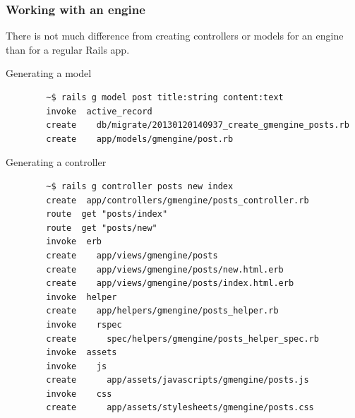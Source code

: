 \documentclass[compress]{beamer}
\begin{document}
\begin{frame}[fragile]
\frametitle{Working with an engine}

There is not much difference from creating controllers or models for an engine
than for a regular Rails app.
\begin{itemize}
    \begin{item}
      Generating a model
      \begin{verbatim}
        ~$ rails g model post title:string content:text
        invoke  active_record
        create    db/migrate/20130120140937_create_gmengine_posts.rb
        create    app/models/gmengine/post.rb
      \end{verbatim}
    \end{item}
    \begin{item}
      Generating a controller
      \begin{verbatim}
        ~$ rails g controller posts new index
        create  app/controllers/gmengine/posts_controller.rb
        route  get "posts/index"
        route  get "posts/new"
        invoke  erb
        create    app/views/gmengine/posts
        create    app/views/gmengine/posts/new.html.erb
        create    app/views/gmengine/posts/index.html.erb
        invoke  helper
        create    app/helpers/gmengine/posts_helper.rb
        invoke    rspec
        create      spec/helpers/gmengine/posts_helper_spec.rb
        invoke  assets
        invoke    js
        create      app/assets/javascripts/gmengine/posts.js
        invoke    css
        create      app/assets/stylesheets/gmengine/posts.css
      \end{verbatim}
    \end{item}
\end{itemize}
\end{frame}
\end{document}

